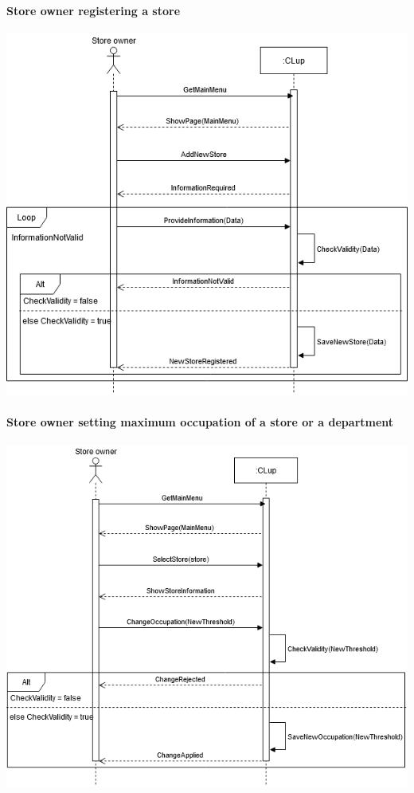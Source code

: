 \paragraph{Store owner registering a store}
\begin{flushleft}
	\includegraphics[scale=0.5]{Images/UseCase8Diagram.png}
\end{flushleft}

\paragraph{Store owner setting maximum occupation of a store or a department}
\begin{flushleft}
	\includegraphics[scale=0.5]{Images/UseCase9Diagram.png}
\end{flushleft}

